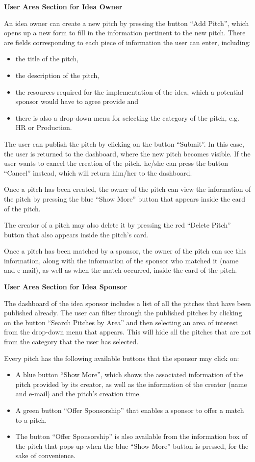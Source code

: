 \textbf{User Area Section for Idea Owner}

An idea owner can create a new pitch by pressing the button “Add Pitch”, which opens up a new form to fill in the information pertinent to the new pitch. There are fields corresponding to each piece of information the user can enter, including:

\begin{itemize}
\item the title of the pitch,
\item the description of the pitch,
\item the resources required for the implementation of the idea, which a potential sponsor would have to agree provide and
\item there is also a drop-down menu for selecting the category of the pitch, e.g. HR or Production.
\end{itemize}

The user can publish the pitch by clicking on the button “Submit”. In this case, the user is returned to the dashboard, where the new pitch becomes visible.
If the user wants to cancel the creation of the pitch, he/she can press the button “Cancel” instead, which will return him/her to the dashboard.

Once a pitch has been created, the owner of the pitch can view the information of the pitch by pressing the blue “Show More” button that appears inside the card of the pitch.

The creator of a pitch may also delete it by pressing the red “Delete Pitch” button that also appears inside the pitch’s card.

Once a pitch has been matched by a sponsor, the owner of the pitch can see this information, along with the information of the sponsor who matched it (name and e-mail), as well as when the match occurred, inside the card of the pitch.


\textbf{User Area Section for Idea Sponsor}

The dashboard of the idea sponsor includes a list of all the pitches that have been published already.
The user can filter through the published pitches by clicking on the button “Search Pitches by Area” and then selecting an area of interest from the drop-down menu that appears. This will hide all the pitches that are not from the category that the user has selected.

Every pitch has the following available buttons that the sponsor may click on:

\begin{itemize}
\item A blue button “Show More”, which shows the associated information of the pitch provided by its creator, as well as the information of the creator (name and e-mail) and the pitch’s creation time.
\item A green button “Offer Sponsorship” that enables a sponsor to offer a match to a pitch.
\item The button “Offer Sponsorship” is also available from the information box of the pitch that pops up when the blue “Show More” button is pressed, for the sake of convenience.
\end{itemize}

